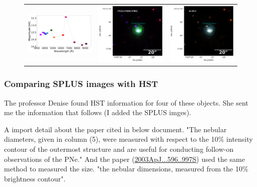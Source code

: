 \documentclass[11pt]{article}
\begin{document}
\begin{figure}[!h]
\begin{tabular}{ccc}
\includegraphics[width=0.3\linewidth, clip]{photopectrum_splus_MC0116-191358_compat-HIIRegions-smc-match-splus_aper.pdf} & \includegraphics[width=0.3\linewidth, clip]{MC0116/MC0116_F861_191358-RGB.pdf} & \includegraphics[width=0.3\linewidth, clip]{MC0116/MC0116_I_191358-RGB.pdf} \\
 \end{tabular}
\caption{}
\end{figure}

\newpage
\subsubsection{Comparing SPLUS images with HST}
\label{sec:hst}
The professor Denise found HST information for four of these objects. She sent me the information that follows (I added the SPLUS imges).

A import detail about the paper cited in below document. "The nebular diameters, given in column (5), were measured with respect to the 10\% intensity contour of the outermost structure and are useful for conducting follow-on observations of the PNe." And the paper (\url{2003ApJ...596..997S}) used the same method to measured the size. "the nebular dimensions, measured from the 10\% brightness contour".


\end{document}
